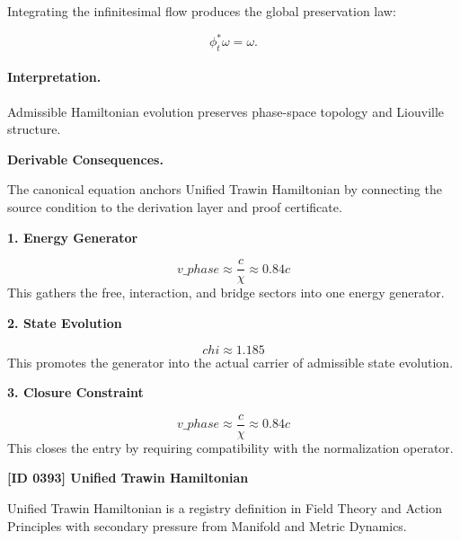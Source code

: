 Integrating the infinitesimal flow produces the global preservation law:

\begin{equation}
\boxed{
\phi_t^{*}\omega=\omega.
}
\end{equation}

\paragraph{Interpretation.}
Admissible Hamiltonian evolution preserves phase-space topology and Liouville structure.

\par\vspace{0.35em}
\noindent\textbf{Derivable Consequences.}\quad
\begingroup
\footnotesize
\raggedright
The canonical equation anchors Unified Trawin Hamiltonian by connecting the source condition to the derivation layer and proof certificate.
\par\endgroup

\noindent\textbf{1. Energy Generator}\par
\[
v\_{phase} \approx \frac{c}{\chi} \approx 0.84c
\]
\noindent This gathers the free, interaction, and bridge sectors into one energy generator.\par
\noindent\textbf{2. State Evolution}\par
\[
chi \approx 1.185
\]
\noindent This promotes the generator into the actual carrier of admissible state evolution.\par
\noindent\textbf{3. Closure Constraint}\par
\[
v\_{phase} \approx \frac{c}{\chi} \approx 0.84c
\]
\noindent This closes the entry by requiring compatibility with the normalization operator.\par

\clearpage
\noindent\textbf{[ID 0393] Unified Trawin Hamiltonian}\par
\vspace{0.35em}
\begingroup\small
{}
Unified Trawin Hamiltonian is a registry definition in Field Theory and Action Principles with secondary pressure from Manifold and Metric Dynamics.

